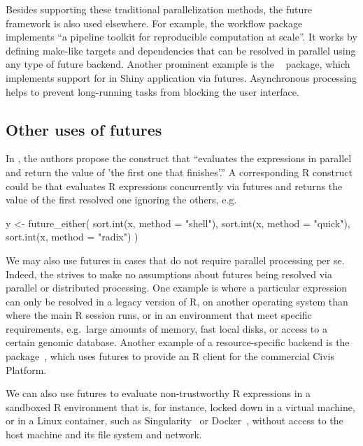 Besides supporting these traditional parallelization methods, the
future framework is also used elsewhere.  For example, the workflow
package ~\citep{Landau_2018} implements ``a pipeline
toolkit for reproducible computation at scale''.  It works by defining
make-like targets and dependencies that can be resolved in parallel
using any type of future backend.
%
Another prominent example is the ~\citep{CRAN:shiny}
package, which implements support for  in
Shiny application via futures.  Asynchronous processing helps to
prevent long-running tasks from blocking the user interface.


\subsection{Other uses of futures}
\label{other-usages}

In \citet{HewittBaker_1977}, the authors propose the
 construct that ``evaluates the expressions in
parallel and return the value of 'the first one that finishes'.''  A
corresponding R construct could be  that
evaluates R expressions concurrently via futures and returns the value
of the first resolved one ignoring the others, e.g.
\begin{example}
y <- future_either(
  sort.int(x, method = "shell"),
  sort.int(x, method = "quick"),
  sort.int(x, method = "radix")
)
\end{example}

We may also use futures in cases that do not require parallel
processing per se.  Indeed, the  strives to make no
assumptions about futures being resolved via parallel or distributed
processing.  One example is where a particular expression can only be
resolved in a legacy version of R, on another operating system than
where the main R session runs, or in an environment that meet specific
requirements, e.g.\ large amounts of memory, fast local disks, or
access to a certain genomic database.  Another example of a
resource-specific backend is the 
package~\citep{CRAN:civis}, which uses futures to provide an R client
for the commercial Civis Platform.

We can also use futures to evaluate non-trustworthy R expressions in a
sandboxed R environment that is, for instance, locked down in a
virtual machine, or in a Linux container, such as
Singularity~\citep{Kurtzer2017} or Docker~\citep{Merkel2014}, without
access to the host machine and its file system and network.



